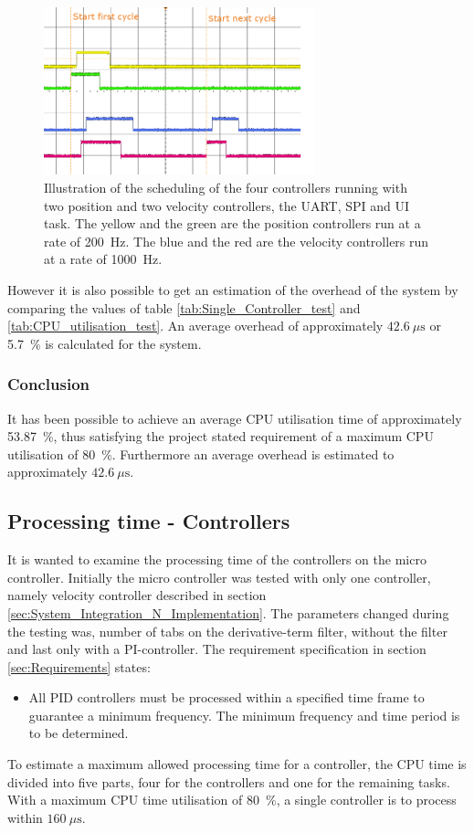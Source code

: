 \documentclass[../../main.tex]{subfiles}
\begin{document}
\begin{figure}
    \centering
    \includegraphics[width=0.7\textwidth]{Sections/Test/Images/Four_controllers_revised-white.png}
    \caption{Illustration of the scheduling of the four controllers running with two position and two velocity controllers, the UART, SPI and UI task. The yellow and the green are the position controllers run at a rate of \SI{200}{\hertz}. The blue and the red are the velocity controllers run at a rate of \SI{1000}{\hertz}.}
    \label{fig:Schedueling_controllers}
\end{figure}

However it is also possible to get an estimation of the overhead of the system by comparing the values of table \ref{tab:Single_Controller_test} and \ref{tab:CPU_utilisation_test}. An average overhead of approximately $\SI{42,6}{\mu\second}$ or \SI{5,7}{\percent} is calculated for the system.

\subsubsection*{Conclusion}
It has been possible to achieve an average CPU utilisation time of approximately \SI{ 53,87}{\percent}, thus satisfying the project stated requirement of a maximum CPU utilisation of \SI{80}{\percent}. Furthermore an average overhead is estimated to approximately $\SI{42,6}{\mu\second}$.

\subsection{Processing time - Controllers}
It is wanted to examine the processing time of the controllers on the micro controller. Initially the micro controller was tested with only one controller, namely velocity controller described in section \ref{sec:System_Integration_N_Implementation}. The parameters changed during the testing was, number of tabs on the derivative-term filter, without the filter and last only with a PI-controller.  The requirement specification in section \ref{sec:Requirements} states:
\begin{itemize}
    \item All PID controllers must be processed within a specified time frame to guarantee a minimum frequency. The minimum frequency and time period is to be determined.
\end{itemize}
To estimate a maximum allowed processing time for a controller, the CPU time is divided into five parts, four for the controllers and one for the remaining tasks. With a maximum CPU time utilisation of \SI{80}{\percent}, a single controller is to process within $\SI{160}{\mu\second}$.
\end{document}
